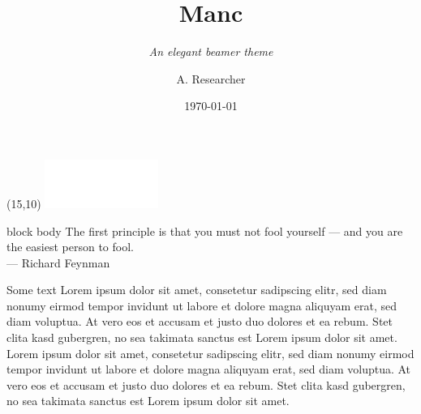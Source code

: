 \documentclass[compress,aspectratio=1610]{beamer}
\title{Manc}
\subtitle{\textit{An elegant beamer theme}}
\date{\today}
\author{A. Researcher}
\institute{\texttt{mymail@myuniversity.edu}}
\begin{document}
\begin{frame}
  \titlepage
  \begin{textblock}{1}(15,10)
    \includegraphics[width=10em]{./graphics/manchester.pdf}
  \end{textblock}
\end{frame}

\begin{frame}
  \hfill
  \begin{beamercolorbox}[
    leftskip=0.4cm,
    rightskip=0.4cm,
    wd=27em,
    ht=8em,
    dp=1em,
  ]{block body}
    The first principle is that you must not fool yourself — and you are the easiest person to fool.\\
    \hfill — Richard Feynman
  \end{beamercolorbox}
  \hfill{}
\end{frame}

\begin{frame}{Some text}
	Lorem ipsum dolor sit amet, consetetur sadipscing elitr, sed diam nonumy eirmod tempor invidunt ut labore et dolore magna aliquyam erat, sed diam voluptua. At vero eos et accusam et justo duo dolores et ea rebum. Stet clita kasd gubergren, no sea takimata sanctus est Lorem ipsum dolor sit amet. Lorem  ipsum dolor sit amet, consetetur sadipscing elitr, sed diam nonumy eirmod tempor invidunt ut labore et dolore magna aliquyam erat, sed diam voluptua. At vero eos et accusam et justo duo dolores et ea rebum. Stet clita kasd gubergren, no sea takimata sanctus est Lorem ipsum dolor sit amet.
\end{frame}
\end{document}
